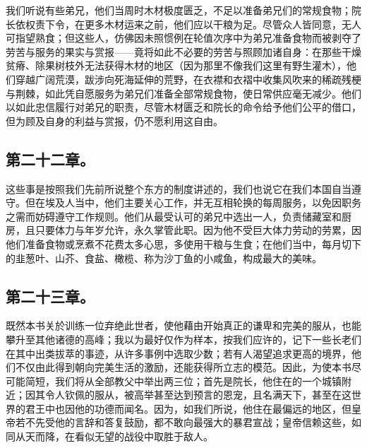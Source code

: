 \par

我们听说有些弟兄，他们当周时木材极度匮乏，不足以准备弟兄们的常规食物；院长依权责下令，在更多木材运来之前，他们应以干粮为足。尽管众人皆同意，无人可指望熟食；但这些人，仿佛因未照惯例在轮值次序中为弟兄准备食物而被剥夺了劳苦与服务的果实与赏报——竟将如此不必要的劳苦与照顾加诸自身：在那些干燥贫瘠、除果树枝外无法获得木材的地区（因为那里不像我们这里有野生灌木），他们穿越广阔荒漠，跋涉向死海延伸的荒野，在衣襟和衣褶中收集风吹来的稀疏残梗与荆棘，如此凭自愿服务为弟兄们准备全部常规食物，使日常供应毫无减少。他们以如此忠信履行对弟兄的职责，尽管木材匮乏和院长的命令给予他们公平的借口，但为顾及自身的利益与赏报，仍不愿利用这自由。\par


\subsection{第二十二章。}

\par

这些事是按照我们先前所说整个东方的制度讲述的，我们也说它在我们本国自当遵守。但在埃及人当中，他们主要关心工作，并无互相轮换的每周服务，以免因职务之需而妨碍遵守工作规则。他们从最受认可的弟兄中选出一人，负责储藏室和厨房，且只要体力与年岁允许，永久掌管此职。因为他不受巨大体力劳动的劳累，因他们准备食物或烹煮不花费太多心思，多使用干粮与生食；在他们当中，每月切下的韭葱叶、山芥、食盐、橄榄、称为沙丁鱼的小咸鱼，构成最大的美味。\par


\subsection{第二十三章。}

\par

既然本书关於训练一位弃绝此世者，使他藉由开始真正的谦卑和完美的服从，也能攀升至其他诸德的高峰；我以为最好仅作为样本，按我们应许的，记下一些长老们在其中出类拔萃的事迹，从许多事例中选取少数；若有人渴望追求更高的境界，他们不仅由此得到朝向完美生活的激励，还能获得所立志的模范。因此，为使本书尽可能简短，我们将从全部教父中举出两三位；首先是院长，他住在的一个城镇附近；因其令人钦佩的服从，被高举甚至达到预言的恩宠，且名满天下，甚至在这世界的君王中也因他的功德而闻名。因为，如我们所说，他住在最偏远的地区，但皇帝若不先受他的言辞和答复鼓励，都不敢向最强大的暴君宣战；皇帝信赖这些，如同从天而降，在看似无望的战役中取胜于敌人。\par

